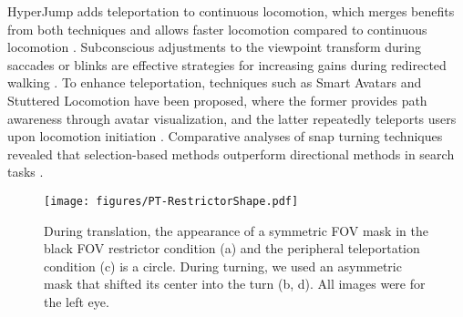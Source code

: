 HyperJump adds teleportation to continuous locomotion, which merges benefits from both techniques and allows faster locomotion compared to continuous locomotion \cite{adhikari_integrating_2022}. 
Subconscious adjustments to the viewpoint transform during saccades or blinks are effective strategies for increasing gains during redirected walking \cite{sun_towards_2018, langbehn_blink_2018}. To enhance teleportation, techniques such as Smart Avatars and Stuttered Locomotion have been proposed, where the former provides path awareness through avatar visualization, and the latter repeatedly teleports users upon locomotion initiation \cite{freiwald_continuity_2022}. Comparative analyses of snap turning techniques revealed that selection-based methods outperform directional methods in search tasks \cite{zielasko_systematic_2022}.



\begin{figure*}
  \centering
  \texttt{[image: figures/PT-RestrictorShape.pdf]}
  \caption{
    During translation, the appearance of a symmetric FOV mask in the black FOV restrictor condition (a) and the peripheral teleportation condition (c) is a circle. 
    During turning, we used an asymmetric mask that shifted its center into the turn (b, d). 
    All images were for the left eye.
  }
  \label{fig:pt_shape}
\end{figure*}